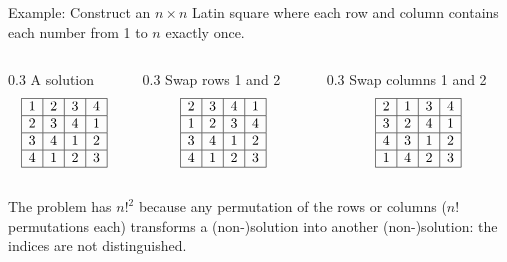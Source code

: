 \documentclass{cons-beamer}
\newcommand{\latinSquaresProblem}{\problemClass{LatinSquares}}
\begin{document}
\begin{frame}{Example: \latinSquaresProblem}
  Construct an $n \times n$ Latin square where each row and column contains each number from 1 to $n$ exactly once. \\[+5pt]
  \vfill

  \begin{columns}
    \begin{column}{0.3\textwidth}
      \centering A solution
      \[
        \begin{array}{|c|c|c|c|}
          \hline
          1 & 2 & 3 & 4 \\
          \hline
          2 & 3 & 4 & 1 \\
          \hline
          3 & 4 & 1 & 2 \\
          \hline
          4 & 1 & 2 & 3 \\
          \hline
        \end{array}
      \]
    \end{column}

    \pause
    \begin{column}{0.3\textwidth}
      \quad Swap rows 1 and 2
      \[
        \begin{array}{|c|c|c|c|}
          \hline
          2 & 3 & 4 & 1 \\
          \hline
          1 & 2 & 3 & 4 \\
          \hline
          3 & 4 & 1 & 2 \\
          \hline
          4 & 1 & 2 & 3 \\
          \hline
        \end{array}
      \]
    \end{column}

    \pause
    \begin{column}{0.3\textwidth}
      Swap columns 1 and 2
      \[
        \begin{array}{|c|c|c|c|}
          \hline
          2 & 1 & 3 & 4 \\
          \hline
          3 & 2 & 4 & 1 \\
          \hline
          4 & 3 & 1 & 2 \\
          \hline
          1 & 4 & 2 & 3 \\
          \hline
        \end{array}
      \]
    \end{column}
  \end{columns}

  \parBreak
  The problem has $n!^2$  because any permutation of the rows or columns ($n!$ permutations each) transforms a (non-)solution into another (non-)solution: the indices are not distinguished.
\end{frame}
\end{document}

